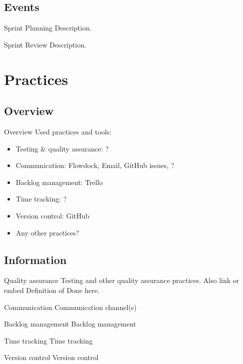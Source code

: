 \documentclass{beamer}
\begin{document}
\subsection{Events}
\begin{frame}{Sprint Planning}{}
  Description.
\end{frame}
\begin{frame}{Sprint Review}{}
  Description.
\end{frame}
\section{Practices}
\subsection{Overview}
\begin{frame}{Overview}{}
  Used practices and tools:
  \begin{itemize}
  \item Testing \& quality assurance: ?
  \item Communication: Flowdock, Email, GitHub issues, ?
  \item Backlog management: Trello
  \item Time tracking: ?
  \item Version control: GitHub
  \item Any other practices?
  \end{itemize}
\end{frame}
\subsection{Information}
\begin{frame}{Quality assurance}{}
  Testing and other quality assurance practices. Also link or embed Definition
  of Done here.
\end{frame}
\begin{frame}{Communication}{}
  Communication channel(s)
\end{frame}
\begin{frame}{Backlog management}{}
  Backlog management
\end{frame}
\begin{frame}{Time tracking}{}
  Time tracking
\end{frame}
\begin{frame}{Version control}{}
  Version control
\end{frame}
\end{document}
